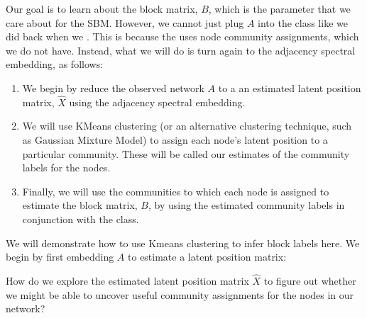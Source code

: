 \documentclass[letterpaper,10pt,english]{jupyterBook}
\begin{document}
\sphinxAtStartPar
Our goal is to learn about the block matrix, \(B\), which is the parameter that we care about for the SBM. However, we cannot just plug \(A\) into the  class like we did back when we . This is because the  uses node community assignments, which we do not have. Instead, what we will do is turn again to the adjacency spectral embedding, as follows:
\begin{enumerate}
%
\item {} 
\sphinxAtStartPar
We begin by reduce the observed network \(A\) to a an estimated latent position matrix, \(\hat X\) using the adjacency spectral embedding.

\item {} 
\sphinxAtStartPar
We will use K\sphinxhyphen{}Means clustering (or an alternative clustering technique, such as Gaussian Mixture Model) to assign each node’s latent position to a particular community. These will be called our estimates of the community labels for the nodes.

\item {} 
\sphinxAtStartPar
Finally, we will use the communities to which each node is assigned to estimate the block matrix, \(B\), by using the estimated community labels in conjunction with the  class.

\end{enumerate}

\sphinxAtStartPar
We will demonstrate how to use K\sphinxhyphen{}means clustering to infer block labels here. We begin by first embedding \(A\) to estimate a latent position matrix:

\begin{sphinxVerbatim}[commandchars=\\\{\}]
   

    
  
\end{sphinxVerbatim}

\sphinxAtStartPar
How do we explore the estimated latent position matrix \(\hat X\) to figure out whether we might be able to uncover useful community assignments for the nodes in our network?
\end{document}
